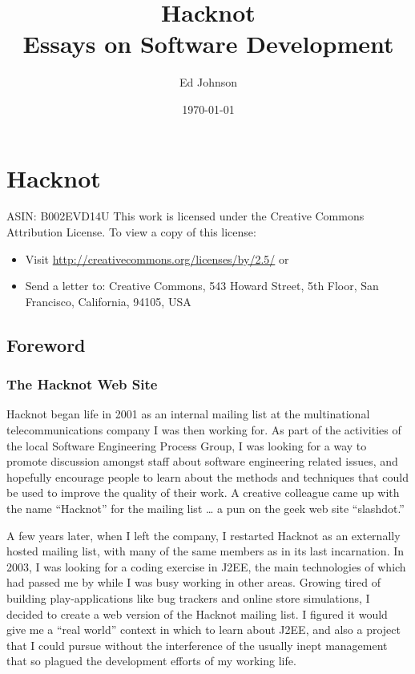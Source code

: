 \documentclass{article}
\author{Ed Johnson}
\date{\today}
\title{Hacknot\\\medskip
\large Essays on Software Development}
\begin{document}
\maketitle
\tableofcontents


\section{Hacknot}
\label{sec:orgheadline423}

ASIN: B002EVD14U This work is licensed under the Creative Commons
Attribution License. To view a copy of this license:

\begin{itemize}
\item Visit \url{http://creativecommons.org/licenses/by/2.5/} or
\item Send a letter to: Creative Commons, 543 Howard Street, 5th Floor, San
Francisco, California, 94105, USA
\end{itemize}

\subsection{Foreword}
\label{sec:orgheadline3}

\subsubsection{The Hacknot Web Site}
\label{sec:orgheadline1}

Hacknot began life in 2001 as an internal mailing list at the
multinational telecommunications company I was then working for. As part
of the activities of the local Software Engineering Process Group, I was
looking for a way to promote discussion amongst staff about software
engineering related issues, and hopefully encourage people to learn
about the methods and techniques that could be used to improve the
quality of their work. A creative colleague came up with the name
“Hacknot” for the mailing list \ldots{} a pun on the geek web site
“slashdot.”

A few years later, when I left the company, I restarted Hacknot as an
externally hosted mailing list, with many of the same members as in its
last incarnation. In 2003, I was looking for a coding exercise in J2EE,
the main technologies of which had passed me by while I was busy working
in other areas. Growing tired of building play-applications like bug
trackers and online store simulations, I decided to create a web version
of the Hacknot mailing list. I figured it would give me a “real world”
context in which to learn about J2EE, and also a project that I could
pursue without the interference of the usually inept management that so
plagued the development efforts of my working life.
\end{document}
